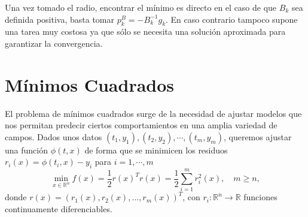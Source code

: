 \documentclass[11pt,a4paper]{book}
\theoremstyle{definition}
\theoremstyle{remark}
\begin{document}
Una vez tomado el radio, encontrar el mínimo es directo en el caso de que $B_k$ sea definida positiva, basta tomar $p_k^B = -B_k^{-1}g_k$. En caso contrario tampoco supone una tarea muy costosa ya que sólo se necesita una solución aproximada para garantizar la convergencia.

\chapter{Mínimos Cuadrados}

El problema de mínimos cuadrados surge de la necesidad de ajustar modelos que nos permitan predecir ciertos comportamientos en una amplia variedad de campos. Dados unos datos $(t_1,y_1),(t_2,y_2),\cdots,(t_m,y_m)$, queremos ajustar una función
$\phi(t,x)$ de forma que se minimicen los residuos $r_i(x) = \phi(t_i,x) - y_i$ para $i=1,\cdots,m$
\begin{equation}
	\min_{x\in \mathbb{R}^{n}}f(x) = \frac{1}{2} r(x)^Tr(x) = \frac{1}{2}\sum_{i=1}^{m}r_i^2(x), \quad m\geq n,
	\label{eq:lsp}
\end{equation}
donde $r(x) = (r_1(x), r_2(x), \ldots, r_m(x))^T$, con $r_i : \mathbb{R}^{n} \rightarrow \mathbb{R}$ funciones continuamente diferenciables. 

\end{document}
